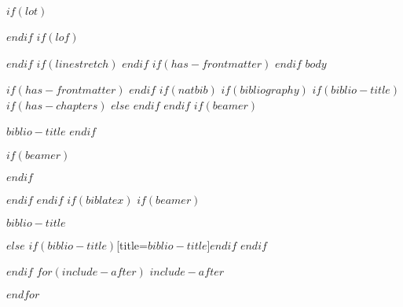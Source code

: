 \documentclass[11pt,fleqn,$for(classoption)$$classoption$$sep$,$endfor$]{book} %
\begin{document}
\pagestyle{empty} %

\tableofcontents %

\cleardoublepage %

\pagestyle{fancy} %

$if(lot)$
\listoftables
$endif$
$if(lof)$
\listoffigures
$endif$
$if(linestretch)$
$endif$
$if(has-frontmatter)$
\mainmatter
$endif$
$body$

$if(has-frontmatter)$
\backmatter
$endif$
$if(natbib)$
$if(bibliography)$
$if(biblio-title)$
$if(has-chapters)$
\renewcommand\bibname{$biblio-title$}
$else$
\renewcommand\refname{$biblio-title$}
$endif$
$endif$
$if(beamer)$
\begin{frame}[allowframebreaks]{$biblio-title$}
  \bibliographytrue
$endif$
  
$if(beamer)$
\end{frame}
$endif$

$endif$
$endif$
$if(biblatex)$
$if(beamer)$
\begin{frame}[allowframebreaks]{$biblio-title$}
  \bibliographytrue
  \printbibliography[heading=none]
\end{frame}
$else$
\printbibliography$if(biblio-title)$[title=$biblio-title$]$endif$
$endif$

$endif$
$for(include-after)$
$include-after$

$endfor$
\end{document}
